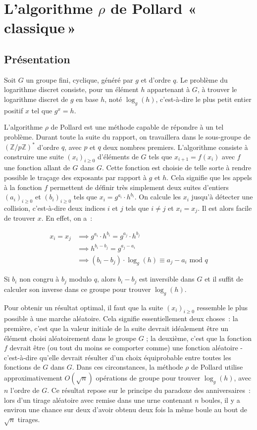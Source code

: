 \chapter{L'algorithme \texorpdfstring{$\rho$}{Rho} de Pollard «\texorpdfstring{\,}{\ }classique\texorpdfstring{\,}{\ }»}
    	\section{Présentation}
      Soit $G$ un groupe fini, cyclique, généré par $g$ et d'ordre $q$. Le problème du logarithme discret consiste, pour un élément $h$ appartenant à $G$, à trouver le logarithme discret de $g$ en base $h$, noté $\log_g(h)$, c'est-à-dire le plus petit entier positif $x$ tel que $g^x = h$.

    	L'algorithme $\rho$ de Pollard est une méthode capable de répondre à un tel problème. Durant toute la suite du rapport, on travaillera dans le sous-groupe de $(\mathbb{Z}/p\mathbb{Z})^*$ d'ordre $q$, avec $p$ et $q$ deux nombres premiers. L'algorithme consiste à construire une suite $(x_i)_{i \ge 0}$ d'éléments de $G$ tels que $x_{i+1} = f(x_i)$ avec $f$ une fonction allant de $G$ dans $G$. Cette fonction est choisie de telle sorte à rendre possible le traçage des exposants par rapport à $g$ et $h$. Cela signifie que les appels à la fonction $f$ permettent de définir très simplement deux suites d'entiers $(a_i)_{i \ge 0}$ et $(b_i)_{i \ge 0}$ tels que $x_i = g^{a_i} \cdot h^{b_i}$. On calcule les $x_i$ jusqu'à détecter une collision, c'est-à-dire deux indices $i$ et $j$ tels que $i \ne j$ et $x_i = x_j$. Il est alors facile de trouver $x$. En effet, on a~:

    	\begin{align*}
        x_i = x_j &\implies g^{a_i} \cdot h^{b_i} = g^{a_j} \cdot h^{b_j} \\
                  &\implies h^{b_i - b_j} = g^{a_j - a_i} \\
                  &\implies (b_i - b_j) \cdot \log_g(h) \equiv a_j - a_i \text{\ mod } q
      \end{align*}

      Si $b_i$ non congru à $b_j$ modulo $q$, alors $b_i - b_j$ est inversible dans $G$ et il suffit de calculer son inverse dans ce groupe pour trouver $\log_g(h)$.
      
      Pour obtenir un résultat optimal, il faut que la suite $(x_i)_{i \ge 0}$ ressemble le plus possible à une marche aléatoire. Cela signifie essentiellement deux choses~: la première, c'est que la valeur initiale de la suite devrait idéalement être un élément choisi aléatoirement dans le groupe $G$ ; la deuxième, c'est que la fonction $f$ devrait être (ou tout du moins se comporter comme) une fonction aléatoire - c'est-à-dire qu'elle devrait résulter d'un choix équiprobable entre toutes les fonctions de $G$ dans $G$. Dans ces circonstances, la méthode $\rho$ de Pollard utilise approximativement $O(\sqrt{n})$ opérations de groupe pour trouver $\log_g(h)$, avec $n$ l'ordre de $G$. Ce résultat repose sur le principe du paradoxe des anniversaires~: lors d'un tirage aléatoire avec remise dans une urne contenant $n$ boules, il y a environ une chance sur deux d'avoir obtenu deux fois la même boule au bout de $\sqrt{n}$ tirages.
    	
